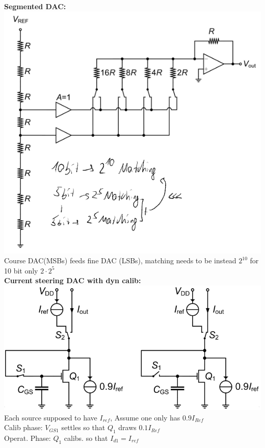 \documentclass[5pt]{article}
\begin{document}
\begin{multicols*}{4}
\textbf{Segmented DAC:}\\
\includegraphics[width=\columnwidth]{images/dac_segemented.png}\\
Course DAC(MSBs) feeds fine DAC (LSBs), matching needs to be instead $ 2^10 $ for 10 bit only $ 2 \cdot 2^5 $\\
\textbf{Current steering DAC with dyn calib:}\\
\includegraphics[width=\columnwidth]{images/dac_auto_calib.png}\\
Each source supposed to have $ I_{ref} $, Assume one only has $ 0.9 I_{Ref} $\\
Calib phase: $ V_{GS1} $ settles so that $ Q_1 $ draws $ 0.1 I_{Ref} $\\
Operat. Phase: $ Q_1 $ calibs. so that $ I_{d1} = I_{ref} $













\end{multicols*}
\end{document}
